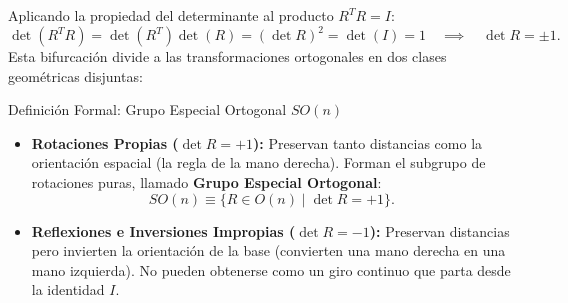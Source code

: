 \documentclass[11pt,letterpaper]{article}
\begin{document}

Aplicando la propiedad del determinante al producto $R^T R = I$:
\[
\det(R^T R) = \det(R^T)\det(R) = (\det R)^2 = \det(I) = 1 \quad \implies \quad \det R = \pm 1.
\]
Esta bifurcación divide a las transformaciones ortogonales en dos clases geométricas disjuntas:

\begin{theorembox}{Definición Formal: Grupo Especial Ortogonal $SO(n)$}
\begin{itemize}
    \item \textbf{Rotaciones Propias ($\det R = +1$):} Preservan tanto distancias como la orientación espacial (la regla de la mano derecha). Forman el subgrupo de rotaciones puras, llamado \textbf{Grupo Especial Ortogonal}:
    \[
    SO(n) \equiv \{ R \in O(n) \mid \det R = +1 \}.
    \]
    \item \textbf{Reflexiones e Inversiones Impropias ($\det R = -1$):} Preservan distancias pero invierten la orientación de la base (convierten una mano derecha en una mano izquierda). No pueden obtenerse como un giro continuo que parta desde la identidad $I$.
\end{itemize}
\end{theorembox}
\end{document}
